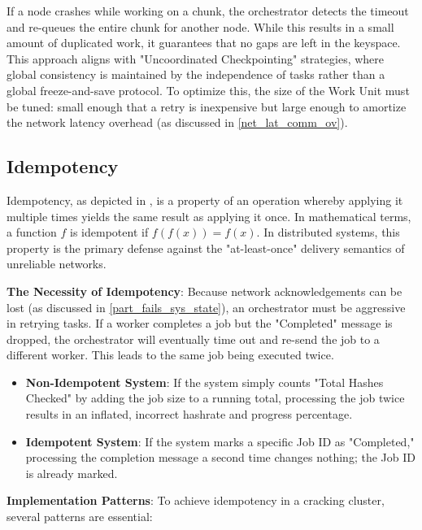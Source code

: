 If a node crashes while working on a chunk, the orchestrator detects the timeout and re-queues the entire chunk for another node. While this results in a small amount of duplicated work, it guarantees that no gaps are left in the keyspace. This approach aligns with "Uncoordinated Checkpointing" strategies, where global consistency is maintained by the independence of tasks rather than a global freeze-and-save protocol. To optimize this, the size of the Work Unit must be tuned: small enough that a retry is inexpensive but large enough to amortize the network latency overhead (as discussed in \ref{net_lat_comm_ov}).

\newpage

\subsection{Idempotency}

Idempotency, as depicted in \cite{idempotency}, is a property of an operation whereby applying it multiple times yields the same result as applying it once. In mathematical terms, a function $f$ is idempotent if $f(f(x)) = f(x)$. In distributed systems, this property is the primary defense against the "at-least-once" delivery semantics of unreliable networks.

\textbf{The Necessity of Idempotency}: Because network acknowledgements can be lost (as discussed in \ref{part_fails_sys_state}), an orchestrator must be aggressive in retrying tasks. If a worker completes a job but the "Completed" message is dropped, the orchestrator will eventually time out and re-send the job to a different worker. This leads to the same job being executed twice.

\begin{itemize}
    \item \textbf{Non-Idempotent System}: If the system simply counts "Total Hashes Checked" by adding the job size to a running total, processing the job twice results in an inflated, incorrect hashrate and progress percentage.

    \item \textbf{Idempotent System}: If the system marks a specific Job ID as "Completed," processing the completion message a second time changes nothing; the Job ID is already marked.
\end{itemize}

\textbf{Implementation Patterns}: To achieve idempotency in a cracking cluster, several patterns are essential:

